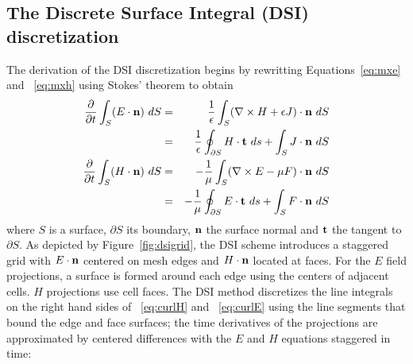 \documentclass[12pt]{article}
\begin{document}
\subsection{The Discrete Surface Integral (DSI) discretization}
The derivation of the DSI discretization begins by rewritting Equations~\ref{eq:mxe} and ~\ref{eq:mxh}
using Stokes' theorem to obtain
\begin{eqnarray}
\frac{\partial}{\partial t}\int_S (E\cdot{\bf n})~dS &=& \frac{1}{\epsilon}\int_S (\nabla \times H + \epsilon J)\cdot{\bf n}~dS \nonumber\\
 &=&\frac{1}{\epsilon}\oint_{\partial S} H\cdot{\bf t}~ds+\int_S J\cdot{\bf n}~dS\label{eq:curlH}\\
\frac{\partial}{\partial t}\int_S (H\cdot{\bf n})~dS &=& -\frac{1}{\mu}\int_S (\nabla \times E - \mu F)\cdot{\bf n}~dS\nonumber\\
 &=&-\frac{1}{\mu}\oint_{\partial S} E\cdot{\bf t}~ds+\int_S F\cdot{\bf n}~dS\label{eq:curlE}
\end{eqnarray}
where $S$ is a surface, $\partial S$ its boundary, ${\bf n}$ the
surface normal and ${\bf t}$ the tangent to $\partial S$.  As depicted
by Figure~\ref{fig:dsigrid}, the DSI scheme introduces a staggered
grid with $E\cdot{\bf n}$ centered on mesh edges and ${H\cdot{\bf n}}$
located at faces.  For the $E$ field projections, a surface is formed
around each edge using the centers of adjacent cells.  $H$ projections
use cell faces.  The DSI method discretizes the line integrals
on the right hand sides of ~\ref{eq:curlH} and ~\ref{eq:curlE} using
the line segments that bound the edge and face surfaces; the time derivatives
of the projections are approximated by centered differences with the
$E$ and $H$ equations staggered in time:
\end{document}
